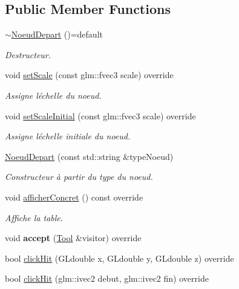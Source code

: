 \subsection*{Public Member Functions}
\begin{DoxyCompactItemize}
\item 
\hypertarget{class_noeud_depart_a6a1abd18717d2072edebff29d5d21995}{}\hyperlink{class_noeud_depart_a6a1abd18717d2072edebff29d5d21995}{$\sim$\+Noeud\+Depart} ()=default\label{class_noeud_depart_a6a1abd18717d2072edebff29d5d21995}

\begin{DoxyCompactList}\small\item\em Destructeur. \end{DoxyCompactList}\item 
void \hyperlink{class_noeud_depart_ac02ac846dec4dd15b5ac2656c0907134}{set\+Scale} (const glm\+::fvec3 scale) override
\begin{DoxyCompactList}\small\item\em Assigne l\textquotesingle{}échelle du noeud. \end{DoxyCompactList}\item 
void \hyperlink{class_noeud_depart_ac2889c3bb1f8f3d373261a93ea455f70}{set\+Scale\+Initial} (const glm\+::fvec3 scale) override
\begin{DoxyCompactList}\small\item\em Assigne l\textquotesingle{}échelle initiale du noeud. \end{DoxyCompactList}\end{DoxyCompactItemize}
{\bf }\par
\begin{DoxyCompactItemize}
\item 
\hyperlink{class_noeud_depart_a003d2fbed3f4e142a9187a8152a4663d}{Noeud\+Depart} (const std\+::string \&type\+Noeud)
\begin{DoxyCompactList}\small\item\em Constructeur à partir du type du noeud. \end{DoxyCompactList}\item 
void \hyperlink{class_noeud_depart_a1335eaf607cc753bf818aded966144fe}{afficher\+Concret} () const  override
\begin{DoxyCompactList}\small\item\em Affiche la table. \end{DoxyCompactList}\item 
\hypertarget{class_noeud_depart_a5c105e25f600256c8933f70e07608413}{}void {\bfseries accept} (\hyperlink{class_tool}{Tool} \&visitor) override\label{class_noeud_depart_a5c105e25f600256c8933f70e07608413}

\item 
bool \hyperlink{class_noeud_depart_a0ad821bd85fa11787016020daa3947fe}{click\+Hit} (G\+Ldouble x, G\+Ldouble y, G\+Ldouble z) override
\item 
bool \hyperlink{class_noeud_depart_a2dfe8b7300b4f1933993d44754e8f53f}{click\+Hit} (glm\+::ivec2 debut, glm\+::ivec2 fin) override
\end{DoxyCompactItemize}

